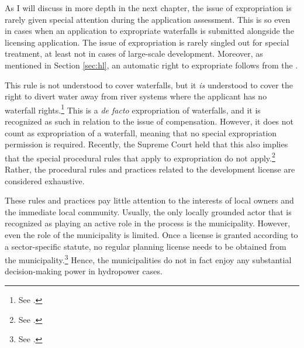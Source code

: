 %

As I will discuss in more depth in the next chapter, the issue of expropriation is rarely given special attention during the application assessment. This is so even in cases when an application to expropriate waterfalls is submitted alongside the licensing application. The issue of expropriation is rarely singled out for special treatment, at least not in cases of large-scale development. Moreover, as mentioned in Section \ref{sec:hl}, an automatic right to expropriate follows from the \cite[16]{wra17}.

This rule is not understood to cover waterfalls, but it {\it is} understood to cover the right to divert water away from river systems where the applicant has no waterfall rights.\footnote{See \cite{jorpeland11}.} This is a {\it de facto} expropriation of waterfalls, and it is recognized as such in relation to the issue of compensation. However, it does not count as expropriation of a waterfall, meaning that no special expropriation permission is required. Recently, the Supreme Court held that this also implies that the special procedural rules that apply to expropriation do not apply.\footnote{See \cite{jorpeland11}.} Rather, the procedural rules and practices related to the development license are considered exhaustive.

These rules and practices pay little attention to the interests of local owners and the immediate local community. Usually, the only locally grounded actor that is recognized as playing an active role in the process is the municipality. However, even the role of the municipality is limited. Once a license is granted according to a sector-specific statute, no regular planning license needs to be obtained from the municipality.\footnote{See \cite[12-1]{pb08}.} Hence, the municipalities do not in fact enjoy any substantial decision-making power in hydropower cases. 

